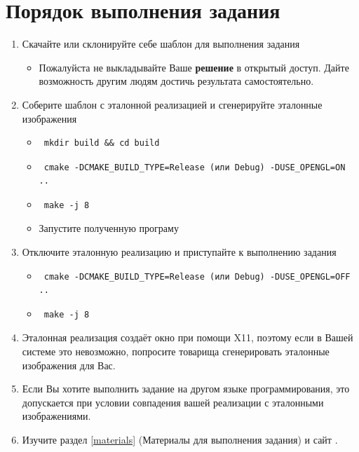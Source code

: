 \documentclass[12pt,subf,href,colorlinks=true]{article}
\begin{document}
\section{Порядок выполнения задания}

\begin{enumerate}
\item Скачайте или склонируйте себе шаблон для выполнения задания \cite{ourtemplate}
  \begin{itemize}
	\item Пожалуйста не выкладывайте Ваше \textbf{решение} в открытый доступ. Дайте возможность другим людям достичь результата самостоятельно.
  \end{itemize}

\item Соберите шаблон с эталонной реализацией и сгенерируйте эталонные изображения
  \begin{itemize}
  \item \begin{verbatim} mkdir build && cd build \end{verbatim}
  \item \begin{verbatim} cmake -DCMAKE_BUILD_TYPE=Release (или Debug) -DUSE_OPENGL=ON .. \end{verbatim}
  \item \begin{verbatim} make -j 8 \end{verbatim}
  \item Запустите полученную програму
  \end{itemize}

\item Отключите эталонную реализацию и приступайте к выполнению задания
   \begin{itemize}
  	\item \begin{verbatim} cmake -DCMAKE_BUILD_TYPE=Release (или Debug) -DUSE_OPENGL=OFF .. \end{verbatim}
  	\item \begin{verbatim} make -j 8 \end{verbatim}
  \end{itemize}

\item Эталонная реализация создаёт окно при помощи X11, поэтому если в Вашей системе это невозможно, попросите товарища сгенерировать эталонные изображения для Вас.

\item Если Вы хотите выполнить задание на другом языке программирования, это допускается при условии совпадения вашей реализации с эталонными изображениями. 

\item Изучите раздел \ref{materials} (Материалы для выполнения задания) и сайт \cite{scratchpixel}.

\end{enumerate}
\end{document}
